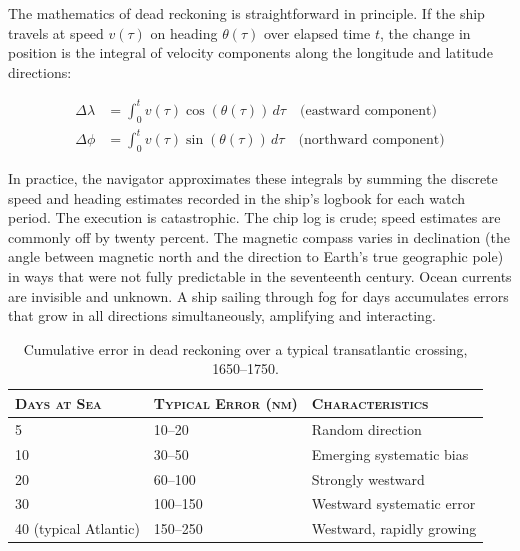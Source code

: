 The mathematics of dead reckoning is straightforward in principle. If the ship travels at speed $v(\tau)$ on heading $\theta(\tau)$ over elapsed time $t$, the change in position is the integral of velocity components along the longitude and latitude directions:

\begin{align}
\Delta \lambda &= \int_0^t v(\tau) \cos(\theta(\tau)) \, d\tau \quad \text{(eastward component)} \\
\Delta \phi &= \int_0^t v(\tau) \sin(\theta(\tau)) \, d\tau \quad \text{(northward component)}
\end{align}

In practice, the navigator approximates these integrals by summing the discrete speed and heading estimates recorded in the ship's logbook for each watch period. The execution is catastrophic. The chip log is crude; speed estimates are commonly off by twenty percent. The magnetic compass varies in declination (the angle between magnetic north and the direction to Earth's true geographic pole) in ways that were not fully predictable in the seventeenth century. Ocean currents are invisible and unknown. A ship sailing through fog for days accumulates errors that grow in all directions simultaneously, amplifying and interacting.

\begin{table}[htbp]
  \centering
  \caption{Cumulative error in dead reckoning over a typical transatlantic crossing, 1650--1750.}
  \label{tab:dead-reckoning-error}
  \begin{tabularx}{\linewidth}{llX}
    \toprule
    \textsc{Days at Sea} & \textsc{Typical Error (nm)} & \textsc{Characteristics} \\
    \midrule
    5 & 10--20 & Random direction \\
    10 & 30--50 & Emerging systematic bias \\
    20 & 60--100 & Strongly westward \\
    30 & 100--150 & Westward systematic error \\
    40 (typical Atlantic) & 150--250 & Westward, rapidly growing \\
    \bottomrule
  \end{tabularx}
\end{table}

